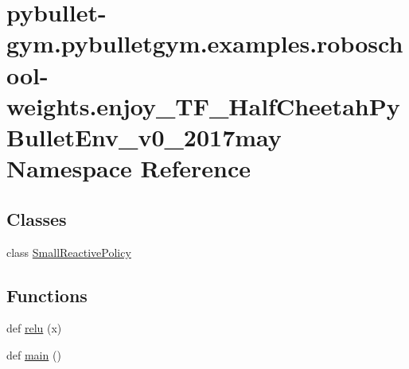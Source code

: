 \hypertarget{namespacepybullet-gym_1_1pybulletgym_1_1examples_1_1roboschool-weights_1_1enjoy___t_f___half_cheetah_py_bullet_env__v0__2017may}{}\section{pybullet-\/gym.pybulletgym.\+examples.\+roboschool-\/weights.enjoy\+\_\+\+T\+F\+\_\+\+Half\+Cheetah\+Py\+Bullet\+Env\+\_\+v0\+\_\+2017may Namespace Reference}
\label{namespacepybullet-gym_1_1pybulletgym_1_1examples_1_1roboschool-weights_1_1enjoy___t_f___half_cheetah_py_bullet_env__v0__2017may}
\subsection*{Classes}
\begin{DoxyCompactItemize}
\item 
class \hyperlink{classpybullet-gym_1_1pybulletgym_1_1examples_1_1roboschool-weights_1_1enjoy___t_f___half_cheetahb776874c865e7480ff5306144a4ec263}{Small\+Reactive\+Policy}
\end{DoxyCompactItemize}
\subsection*{Functions}
\begin{DoxyCompactItemize}
\item 
def \hyperlink{namespacepybullet-gym_1_1pybulletgym_1_1examples_1_1roboschool-weights_1_1enjoy___t_f___half_cheetah_py_bullet_env__v0__2017may_ad693023d759039ef81718b86f9b6d13e}{relu} (x)
\item 
def \hyperlink{namespacepybullet-gym_1_1pybulletgym_1_1examples_1_1roboschool-weights_1_1enjoy___t_f___half_cheetah_py_bullet_env__v0__2017may_a75e32a38a6e7c43861d308995a3c35bf}{main} ()
\end{DoxyCompactItemize}
